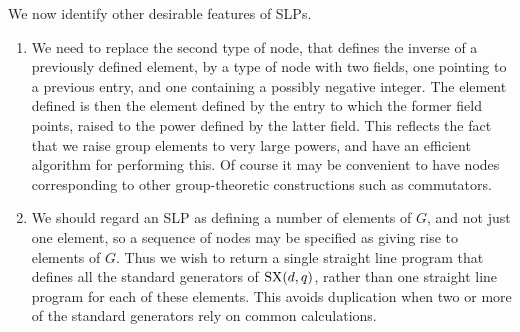 \documentclass[12pt]{article}
\def\SX{{\rm SX}}
\begin{document}
We now identify other desirable features of SLPs. 
\begin{enumerate}
\item 
We need to replace the second type of node, that defines the 
inverse of a previously defined element, by a type of node with two fields, 
one pointing to a previous entry, and one containing 
a possibly negative integer.  The element defined is then the 
element defined by the entry to which
the former field points, raised to the power defined by 
the latter field.  This reflects the fact that we
raise group elements to very large powers, and have 
an efficient algorithm for performing this.
Of course it may be convenient to have nodes corresponding 
to other group-theoretic constructions such as commutators.

\item 
We should regard an SLP as defining a number of elements of $G$,
and not just one element, so a sequence of nodes may be specified as 
giving rise to elements
of $G$.  Thus we wish to return a single straight line program that defines 
all the standard generators of $\SX(d,q)$, rather than one straight line 
program for each of these elements.
This avoids duplication when two or more of the standard generators 
rely on common calculations.



\end{enumerate}
\end{document}
